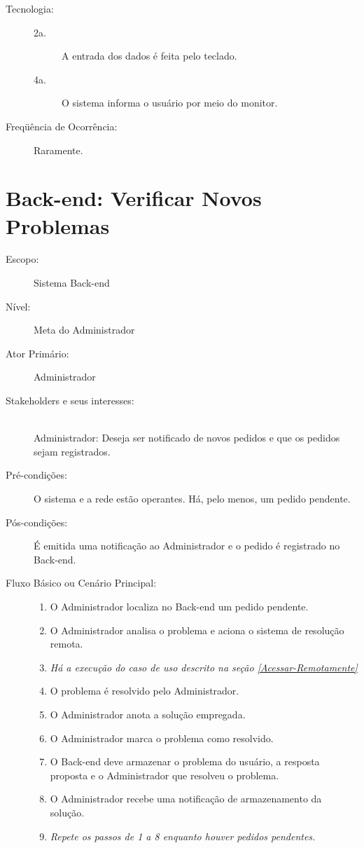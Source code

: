 \documentclass[brazil,times]{abnt}
\begin{document}
\begin{description}
\item[Tecnologia:] \hfill
\begin{description} 
	\item[2a.] A entrada dos dados é feita pelo teclado.
	\item[4a.] O sistema informa o usuário por meio do monitor.
\end{description}
\item[Freqüência de Ocorrência:] Raramente.

\end{description}



\section{Back-end: Verificar Novos Problemas}
\begin{description}
\item[Escopo:] Sistema Back-end
\item[Nível:] Meta do Administrador
\item[Ator Primário:] Administrador
\item[Stakeholders e seus interesses:] \hfill \\
Administrador: Deseja ser notificado de novos pedidos e que os pedidos
sejam registrados.
\item[Pré-condições:] O sistema e a rede estão operantes. Há, pelo menos, um pedido 
pendente.
\item[Pós-condições:]  É emitida uma notificação ao Administrador e o pedido é        
registrado no Back-end.
\item[Fluxo Básico ou Cenário Principal:]\hfill
\begin{enumerate}
  \item O Administrador localiza no Back-end um pedido pendente.
  \item O Administrador analisa o problema e aciona o sistema de resolução
  remota.
  \item \emph{Há a execução do caso de uso descrito na seção \ref{Acessar-Remotamente}}
  \item O problema é resolvido pelo Administrador.
  \item O Administrador anota a solução empregada.
  \item O Administrador marca o problema como resolvido.
  \item O Back-end deve armazenar o problema do usuário, a resposta proposta e
  o Administrador que resolveu o problema.
  \item O Administrador recebe uma notificação de armazenamento da solução.
  \item \emph{Repete os passos de 1 a 8 enquanto houver pedidos pendentes.}
\end{enumerate}


\end{description}
\end{document}
